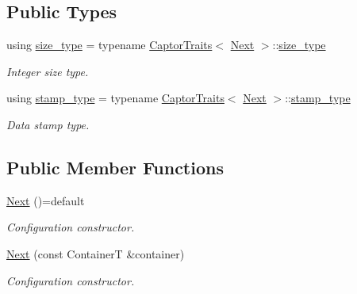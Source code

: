 \subsection*{Public Types}
\begin{DoxyCompactItemize}
\item 
\mbox{\label{classflow_1_1driver_1_1_next_ab4e29edf389659f2222888fec94a53f7}} 
using \hyperlink{classflow_1_1driver_1_1_next_ab4e29edf389659f2222888fec94a53f7}{size\+\_\+type} = typename \hyperlink{structflow_1_1_captor_traits}{Captor\+Traits}$<$ \hyperlink{classflow_1_1driver_1_1_next}{Next} $>$\+::\hyperlink{classflow_1_1driver_1_1_next_ab4e29edf389659f2222888fec94a53f7}{size\+\_\+type}
\begin{DoxyCompactList}\small\item\em Integer size type. \end{DoxyCompactList}\item 
\mbox{\label{classflow_1_1driver_1_1_next_a4ed484dd10198fdc45fc85e9b272097b}} 
using \hyperlink{classflow_1_1driver_1_1_next_a4ed484dd10198fdc45fc85e9b272097b}{stamp\+\_\+type} = typename \hyperlink{structflow_1_1_captor_traits}{Captor\+Traits}$<$ \hyperlink{classflow_1_1driver_1_1_next}{Next} $>$\+::\hyperlink{classflow_1_1driver_1_1_next_a4ed484dd10198fdc45fc85e9b272097b}{stamp\+\_\+type}
\begin{DoxyCompactList}\small\item\em Data stamp type. \end{DoxyCompactList}\end{DoxyCompactItemize}
\subsection*{Public Member Functions}
\begin{DoxyCompactItemize}
\item 
\mbox{\label{classflow_1_1driver_1_1_next_ad1f6c9232ca040b939c600567baa6cec}} 
\hyperlink{classflow_1_1driver_1_1_next_ad1f6c9232ca040b939c600567baa6cec}{Next} ()=default
\begin{DoxyCompactList}\small\item\em Configuration constructor. \end{DoxyCompactList}\item 
\hyperlink{classflow_1_1driver_1_1_next_adff85b386770f4322df5903214852f32}{Next} (const ContainerT \&container)
\begin{DoxyCompactList}\small\item\em Configuration constructor. \end{DoxyCompactList}\end{DoxyCompactItemize}
